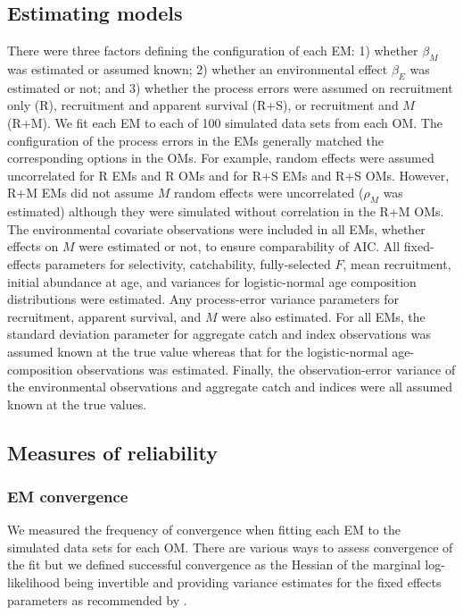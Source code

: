\documentclass[
  12pt,
]{article}
\begin{document}
\subsection*{Estimating models}\label{estimating-models}

There were three factors defining the configuration of each EM: 1) whether \(\beta_M\) was estimated or assumed known; 2) whether an environmental effect \(\beta_E\) was estimated or not; and 3) whether the process errors were assumed on recruitment only (R), recruitment and apparent survival (R+S), or recruitment and \(M\) (R+M). We fit each EM to each of 100 simulated data sets from each OM. The configuration of the process errors in the EMs generally matched the corresponding options in the OMs. For example, random effects were assumed uncorrelated for R EMs and R OMs and for R+S EMs and R+S OMs. However, R+M EMs did not assume \(M\) random effects were uncorrelated (\(\rho_M\) was estimated) although they were simulated without correlation in the R+M OMs. The environmental covariate observations were included in all EMs, whether effects on \(M\) were estimated or not, to ensure comparability of AIC. All fixed-effects parameters for selectivity, catchability, fully-selected \(F\), mean recruitment, initial abundance at age, and variances for logistic-normal age composition distributions were estimated. Any process-error variance parameters for recruitment, apparent survival, and \(M\) were also estimated. For all EMs, the standard deviation parameter for aggregate catch and index observations was assumed known at the true value whereas that for the logistic-normal age-composition observations was estimated. Finally, the observation-error variance of the environmental observations and aggregate catch and indices were all assumed known at the true values.

\subsection*{Measures of reliability}\label{measures-of-reliability}

\subsubsection*{EM convergence}\label{em-convergence}

We measured the frequency of convergence when fitting each EM to the simulated data sets for each OM. There are various ways to assess convergence of the fit \citep[e.g.,][]{carvalhoetal21} but we defined successful convergence as the Hessian of the marginal log-likelihood being invertible and providing variance estimates for the fixed effects parameters as recommended by \citet{milleretal_inreview1}.
\end{document}
